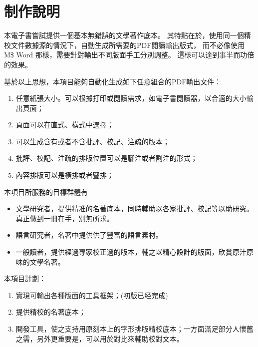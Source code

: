 %

\chapter*{制作說明}

本電子書嘗試提供一個基本無錯誤的文學著作底本。
其特點在於，使用同一個精校文件數據源的情況下，自動生成所需要的PDF閱讀輸出版式，
而不必像使用 M\$ Word 那樣，需要針對輸出不同版面手工分別調整。
這樣可以達到事半而功倍的效果。

基於以上思想，本項目能夠自動化生成如下任意組合的PDF輸出文件：
\begin{enumerate}
  \item 任意紙張大小。可以根據打印或閱讀需求，如電子書閱讀器，以合適的大小輸出頁面；
  \item 頁面可以在直式、橫式中選擇；
  \item 可以生成含有或者不含批評、校記、注疏的版本；
  \item 批評、校記、注疏的排版位置可以是腳注或者割注的形式；
  \item 內容排版可以是橫排或者豎排；
\end{enumerate}



本項目所服務的目標群體有

\begin{itemize}
  \item 文學研究者，提供精准的名著底本，同時輔助以各家批評、校記等以助研究。真正做到一冊在手，別無所求。
  \item 語言研究者，名著中提供供了豐富的語言素材。
  \item 一般讀者，提供經過專家校正過的版本，輔之以精心設計的版面，欣賞原汁原味的文學名著。
\end{itemize}



本項目計劃：

\begin{enumerate}
  \item 實現可輸出各種版面的工具框架；(初版已经完成) %
  \item 提供精校的名著底本；
  \item 開發工具，使之支持用原刻本上的字形排版精校底本；一方面滿足部分人懷舊之需，另外更重要是，可以用於對比來輔助校對文本。
\end{enumerate}


